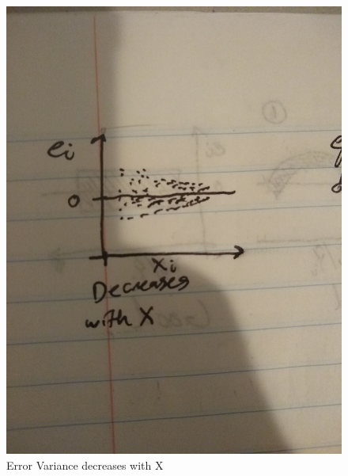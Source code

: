 \documentclass[11pt]{article}
\begin{document}
\begin{figure}[htbp]
\centering
\includegraphics[width=.9\linewidth]{./images/3.2_1.jpg}
\caption{\label{fig:org28b4488}
Error Variance decreases with X}
\end{figure}
\end{document}
